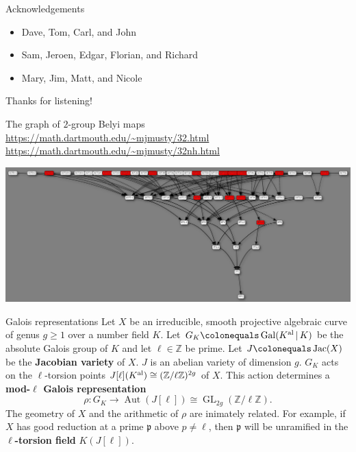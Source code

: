 \documentclass[handout,xcolor=dvipsnames]{beamer}
\theoremstyle{plain}
\newcommand{\ZZ}{\mathbb Z}
\newcommand{\Kal}{{{K}^{\textup{al}}}}
\DeclareMathOperator{\Aut}{Aut}
\DeclareMathOperator{\Gal}{Gal}
\DeclareMathOperator{\GL}{GL}
\DeclareMathOperator{\Jac}{Jac}
\begin{document}
  \begin{frame}{Acknowledgements}
    \begin{itemize}
      \item
        Dave, Tom, Carl, and John
      \item
        Sam, Jeroen, Edgar, Florian, and Richard
      \item
        Mary, Jim, Matt, and Nicole
    \end{itemize}
    \pause
    \begin{center}
      {\Huge Thanks for listening!}
    \end{center}
  \end{frame}
  \appendix
  \begin{frame}{The graph of $2$-group Belyi maps}
    \url{https://math.dartmouth.edu/~mjmusty/32.html}
    \newline
    \url{https://math.dartmouth.edu/~mjmusty/32nh.html}
    \begin{center}
      \includegraphics[scale=0.17]{32.png}
    \end{center}
  \end{frame}
  \begin{frame}{Galois representations}
    Let $X$ be an irreducible, smooth
    projective algebraic curve of genus $g\geq 1$
    over a number field $K$.
    Let $G_K\colonequals\Gal(\Kal\,|\,K)$ be
    the absolute Galois group of $K$ and
    let $\ell\in\ZZ$ be prime.
    \newline
    Let $J\colonequals\Jac(X)$ be the
    \textbf{Jacobian variety} of $X$.
    $J$ is an abelian variety of dimension $g$.
    \newline
    $G_K$ acts on the $\ell$-torsion points
    $J[\ell](\Kal)\cong(\ZZ/\ell\ZZ)^{2g}$ of $X$.
    \newline
    This action determines a
    \textbf{mod-$\ell$ Galois representation}
    \[
      \rho\colon G_K\to\Aut(J[\ell])\cong\GL_{2g}(\ZZ/\ell\ZZ).
    \]
    The geometry of $X$ and the arithmetic of
    $\rho$ are inimately related.
    For example,
    if $X$ has good reduction at a prime
    $\mathfrak{p}$ above
    $p\neq\ell$,
    then $\mathfrak{p}$
    will be unramified in the
    \textbf{$\ell$-torsion field}
    $K(J[\ell])$.
  \end{frame}
\end{document}
